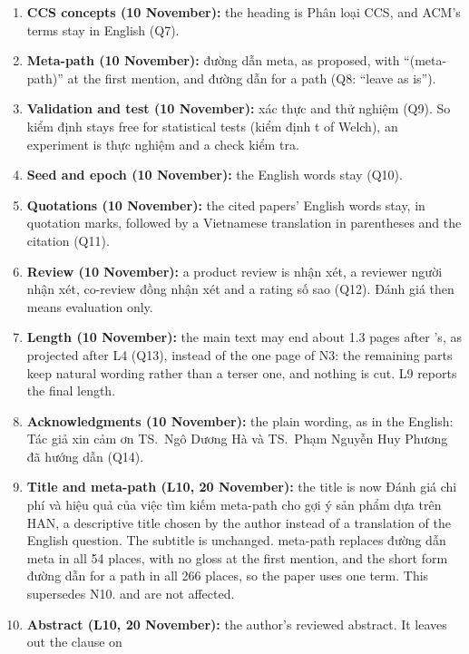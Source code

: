 \documentclass[11pt,a4paper]{article}
\DeclareRobustCommand{\code}[1]{\texttt{\detokenize{#1}}}
\newcommand{\vi}[1]{\foreignlanguage{vietnamese}{#1}}
\begin{document}
\begin{enumerate}[label=N\arabic*]
  \item \textbf{CCS concepts (10 November):} the heading is \vi{Phân loại CCS}, and ACM's terms
        stay in English (Q7).
  \item \textbf{Meta-path (10 November):} \vi{đường dẫn meta}, as proposed, with ``(meta-path)''
        at the first mention, and \vi{đường dẫn} for a path (Q8: ``leave as is'').
  \item \textbf{Validation and test (10 November):} \vi{xác thực} and \vi{thử nghiệm} (Q9). So
        \vi{kiểm định} stays free for statistical tests (\vi{kiểm định t} of Welch), an
        experiment is \vi{thực nghiệm} and a check \vi{kiểm tra}.
  \item \textbf{Seed and epoch (10 November):} the English words stay (Q10).
  \item \textbf{Quotations (10 November):} the cited papers' English words stay, in quotation
        marks, followed by a Vietnamese translation in parentheses and the citation (Q11).
  \item \textbf{Review (10 November):} a product review is \vi{nhận xét}, a reviewer \vi{người
        nhận xét}, co-review \vi{đồng nhận xét} and a rating \vi{số sao} (Q12). \vi{Đánh giá}
        then means evaluation only.
  \item \textbf{Length (10 November):} the main text may end about 1.3 pages after
        \code{paper_v2}'s, as projected after L4 (Q13), instead of the one page of N3: the
        remaining parts keep natural wording rather than a terser one, and nothing is cut. L9
        reports the final length.
  \item \textbf{Acknowledgments (10 November):} the plain wording, as in the English: \vi{Tác giả
        xin cảm ơn TS.~Ngô Dương Hà và TS.~Phạm Nguyễn Huy Phương đã hướng dẫn} (Q14).
  \item \textbf{Title and meta-path (L10, 20 November):} the title is now \vi{Đánh giá chi phí và
        hiệu quả của việc tìm kiếm meta-path cho gợi ý sản phẩm dựa trên HAN}, a descriptive title
        chosen by the author instead of a translation of the English question. The subtitle is
        unchanged. \vi{meta-path} replaces \vi{đường dẫn meta} in all 54 places, with no gloss at
        the first mention, and the short form \vi{đường dẫn} for a path in all 266 places, so the
        paper uses one term. This supersedes N10. \code{paper/} and \code{paper_v2/} are not affected.
  \item \textbf{Abstract (L10, 20 November):} the author's reviewed abstract. It leaves out the clause on

\end{enumerate}
\end{document}
